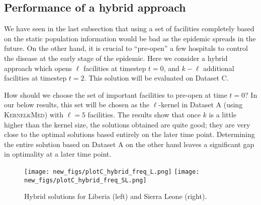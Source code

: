 \subsection*{Performance of a hybrid approach}
We have seen in the last subsection that using a set of facilities completely based on the static population information would be bad as the epidemic spreads in the future. On the other hand, it is crucial to ``pre-open'' a few hospitals to control the disease at the early stage of the epidemic. Here we consider a hybrid approach which opens $\ell$ facilities at timestep $t=0$, and $k-\ell$ additional facilities at timestep $t=2$. This solution will be evaluated on Dataset C.

How should we choose the set of important facilities to pre-open at time $t = 0$? In our below results, this set will be chosen as the $\ell$-kernel in Dataset A (using \textsc{KernelkMed}) with $\ell = 5$ facilities. The results show that once $k$ is a little higher than the kernel size, the solutions obtained are quite good; they are very close to the optimal solutions based entirely on the later time point. Determining the entire solution based on Dataset A on the other hand leaves a significant gap in optimality at a later time point.


\begin{figure}[h]
    \centering
       \texttt{[image: new\_figs/plotC\_hybrid\_freq\_L.png]}
       \texttt{[image: new\_figs/plotC\_hybrid\_freq\_SL.png]}
    \caption{Hybrid solutions for Liberia (left) and Sierra Leone (right).}
\label{fig:hybrid}
\end{figure}


